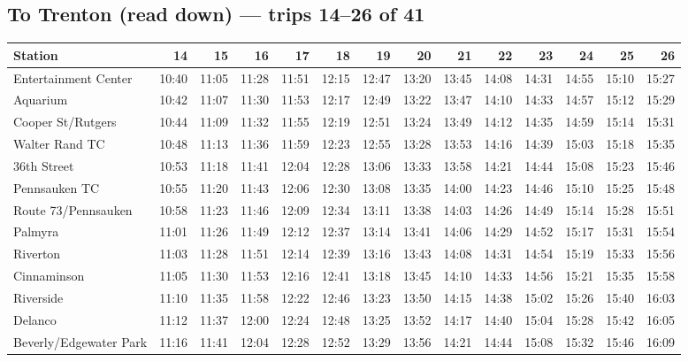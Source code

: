 \subsection*{To Trenton (read down) --- trips 14--26 of 41}
\begin{center}\footnotesize\setlength{\tabcolsep}{3pt}\begin{tabular}{@{}lrrrrrrrrrrrrr@{}}\toprule
Station & 14 & 15 & 16 & 17 & 18 & 19 & 20 & 21 & 22 & 23 & 24 & 25 & 26 \\\midrule
Entertainment Center & 10:40 & 11:05 & 11:28 & 11:51 & 12:15 & 12:47 & 13:20 & 13:45 & 14:08 & 14:31 & 14:55 & 15:10 & 15:27 \\
Aquarium & 10:42 & 11:07 & 11:30 & 11:53 & 12:17 & 12:49 & 13:22 & 13:47 & 14:10 & 14:33 & 14:57 & 15:12 & 15:29 \\
Cooper St/Rutgers & 10:44 & 11:09 & 11:32 & 11:55 & 12:19 & 12:51 & 13:24 & 13:49 & 14:12 & 14:35 & 14:59 & 15:14 & 15:31 \\
Walter Rand TC & 10:48 & 11:13 & 11:36 & 11:59 & 12:23 & 12:55 & 13:28 & 13:53 & 14:16 & 14:39 & 15:03 & 15:18 & 15:35 \\
36th Street & 10:53 & 11:18 & 11:41 & 12:04 & 12:28 & 13:06 & 13:33 & 13:58 & 14:21 & 14:44 & 15:08 & 15:23 & 15:46 \\
Pennsauken TC & 10:55 & 11:20 & 11:43 & 12:06 & 12:30 & 13:08 & 13:35 & 14:00 & 14:23 & 14:46 & 15:10 & 15:25 & 15:48 \\
Route 73/Pennsauken & 10:58 & 11:23 & 11:46 & 12:09 & 12:34 & 13:11 & 13:38 & 14:03 & 14:26 & 14:49 & 15:14 & 15:28 & 15:51 \\
Palmyra & 11:01 & 11:26 & 11:49 & 12:12 & 12:37 & 13:14 & 13:41 & 14:06 & 14:29 & 14:52 & 15:17 & 15:31 & 15:54 \\
Riverton & 11:03 & 11:28 & 11:51 & 12:14 & 12:39 & 13:16 & 13:43 & 14:08 & 14:31 & 14:54 & 15:19 & 15:33 & 15:56 \\
Cinnaminson & 11:05 & 11:30 & 11:53 & 12:16 & 12:41 & 13:18 & 13:45 & 14:10 & 14:33 & 14:56 & 15:21 & 15:35 & 15:58 \\
Riverside & 11:10 & 11:35 & 11:58 & 12:22 & 12:46 & 13:23 & 13:50 & 14:15 & 14:38 & 15:02 & 15:26 & 15:40 & 16:03 \\
Delanco & 11:12 & 11:37 & 12:00 & 12:24 & 12:48 & 13:25 & 13:52 & 14:17 & 14:40 & 15:04 & 15:28 & 15:42 & 16:05 \\
Beverly/Edgewater Park & 11:16 & 11:41 & 12:04 & 12:28 & 12:52 & 13:29 & 13:56 & 14:21 & 14:44 & 15:08 & 15:32 & 15:46 & 16:09 \\

\end{tabular}
\end{center}
